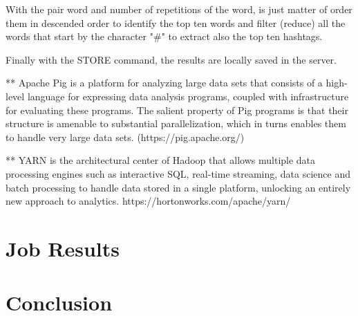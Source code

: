 \documentclass{article}
\begin{document}
        With the pair word and number of repetitions of the word, is just matter of order them in descended order to identify the top ten words and filter (reduce) all the words that start by the character "#" to 
        extract also the top ten hashtags.

        Finally with the STORE command, the results are locally saved in the server.

        ** Apache Pig is a platform for analyzing large data sets that consists of a high-level language for expressing data analysis programs, coupled with infrastructure for evaluating these programs. 
        The salient property of Pig programs is that their structure is amenable to substantial parallelization, which in turns enables them to handle very large data sets. 
        (https://pig.apache.org/)

        ** YARN is the architectural center of Hadoop that allows multiple data processing engines such as interactive SQL, real-time streaming, data science and batch processing to handle data stored 
        in a single platform, unlocking an entirely new approach to analytics.
        https://hortonworks.com/apache/yarn/
        \section{Job Results}
        \section{Conclusion}

        
        
        \nocite{*}

    
\end{document}
